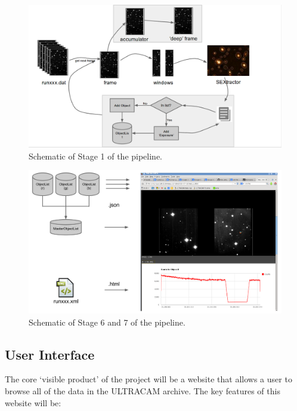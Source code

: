 \documentclass[a4paper,10pt]{article}
\begin{document}
\begin{enumerate}
\end{enumerate}

\begin{figure}[!h]
	\centering
	\includegraphics[width=130mm]{images/flowchart.png}
	\caption{Schematic of Stage 1 of the pipeline.}
	\label{flowchart}
\end{figure}


\begin{figure}[!h]
	\centering
	\includegraphics[width=130mm]{images/webpublish.png}
	\caption{Schematic of Stage 6 and 7 of the pipeline.}
	\label{webpublish}
\end{figure}



\subsection{User Interface}
The core `visible product' of the project will be a website that allows a user to browse all of the data in the ULTRACAM archive. The key features of this website will be:
\end{document}
